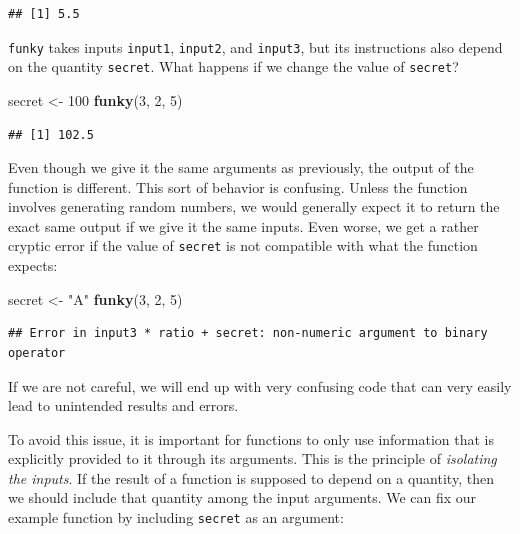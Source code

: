 \documentclass[
]{book}
\newenvironment{Shaded}{\begin{snugshade}}{\end{snugshade}}
\newcommand{\DecValTok}[1]{\textcolor[rgb]{0.00,0.00,0.81}{#1}}
\newcommand{\FunctionTok}[1]{\textcolor[rgb]{0.13,0.29,0.53}{\textbf{#1}}}
\newcommand{\NormalTok}[1]{#1}
\newcommand{\OtherTok}[1]{\textcolor[rgb]{0.56,0.35,0.01}{#1}}
\newcommand{\StringTok}[1]{\textcolor[rgb]{0.31,0.60,0.02}{#1}}
\begin{document}
\begin{verbatim}
## [1] 5.5
\end{verbatim}

\texttt{funky} takes inputs \texttt{input1}, \texttt{input2}, and \texttt{input3}, but its instructions also depend on the quantity \texttt{secret}.
What happens if we change the value of \texttt{secret}?

\begin{Shaded}
\begin{Highlighting}[]
\NormalTok{secret }\OtherTok{\textless{}{-}} \DecValTok{100}
\FunctionTok{funky}\NormalTok{(}\DecValTok{3}\NormalTok{, }\DecValTok{2}\NormalTok{, }\DecValTok{5}\NormalTok{)}
\end{Highlighting}
\end{Shaded}

\begin{verbatim}
## [1] 102.5
\end{verbatim}

Even though we give it the same arguments as previously, the output of the function is different.
This sort of behavior is confusing.
Unless the function involves generating random numbers, we would generally expect it to return the exact same output if we give it the same inputs.
Even worse, we get a rather cryptic error if the value of \texttt{secret} is not compatible with what the function expects:

\begin{Shaded}
\begin{Highlighting}[]
\NormalTok{secret }\OtherTok{\textless{}{-}} \StringTok{"A"}
\FunctionTok{funky}\NormalTok{(}\DecValTok{3}\NormalTok{, }\DecValTok{2}\NormalTok{, }\DecValTok{5}\NormalTok{)}
\end{Highlighting}
\end{Shaded}

\begin{verbatim}
## Error in input3 * ratio + secret: non-numeric argument to binary operator
\end{verbatim}

If we are not careful, we will end up with very confusing code that can very easily lead to unintended results and errors.

To avoid this issue, it is important for functions to only use information that is explicitly provided to it through its arguments.
This is the principle of \emph{isolating the inputs}.
If the result of a function is supposed to depend on a quantity, then we should include that quantity among the input arguments.
We can fix our example function by including \texttt{secret} as an argument:
\end{document}
